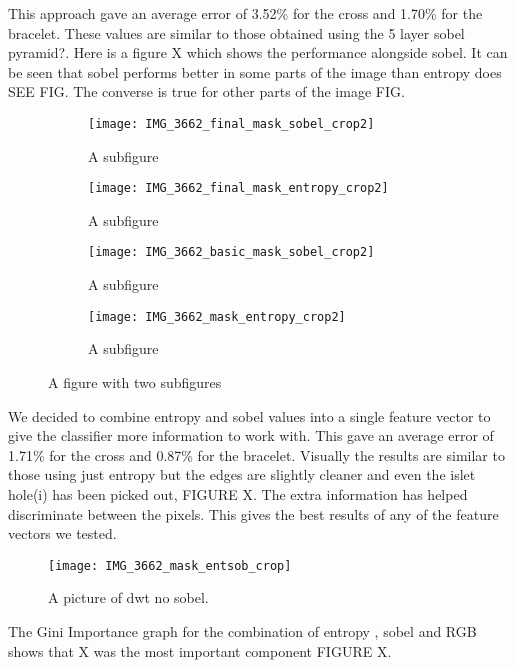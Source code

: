 \documentclass[12pt]{IIBproject}
\begin{document}
This approach gave an average error of 3.52\% for the cross and 1.70\% for the bracelet. These values are similar to those obtained using the 5 layer sobel pyramid?. Here is a figure X which shows the performance alongside sobel. It can be seen that sobel performs better in some parts of the image than entropy does SEE FIG. The converse is true for other parts of the image FIG. 
\begin{figure}[H]
\centering

\begin{subfigure}{.45\textwidth}
  \centering
  \texttt{[image: IMG\_3662\_final\_mask\_sobel\_crop2]}
  \caption{A subfigure}
  \label{fig:sub1}
\end{subfigure}%
\begin{subfigure}{.45\textwidth}
  \centering
  \texttt{[image: IMG\_3662\_final\_mask\_entropy\_crop2]}
  \caption{A subfigure}
  \label{fig:sub2}
\end{subfigure}
\begin{subfigure}{.45\textwidth}
  \centering
  \texttt{[image: IMG\_3662\_basic\_mask\_sobel\_crop2]}
  \caption{A subfigure}
  \label{fig:sub2}
\end{subfigure}
\begin{subfigure}{.45\textwidth}
  \centering
  \texttt{[image: IMG\_3662\_mask\_entropy\_crop2]}
  \caption{A subfigure}
  \label{fig:sub2}
\end{subfigure}


\caption{A figure with two subfigures}
\label{fig:test}
\end{figure}
We decided to combine entropy and sobel values into a single feature vector to give the classifier more information to work with. This gave an average error of 1.71\% for the cross and 0.87\% for the bracelet. Visually the results are similar to those using just entropy but the edges are slightly cleaner and even the islet hole(i) has been picked out, FIGURE X. The extra information has helped discriminate between the pixels. This gives the best results of any of the feature vectors we tested.

\begin{figure}[H]
  \caption{A picture of dwt no sobel.}
  \centering
    \texttt{[image: IMG\_3662\_mask\_entsob\_crop]}
\end{figure}
The Gini Importance graph for the combination of entropy , sobel and RGB shows that X was the most important component FIGURE X.
\end{document}
